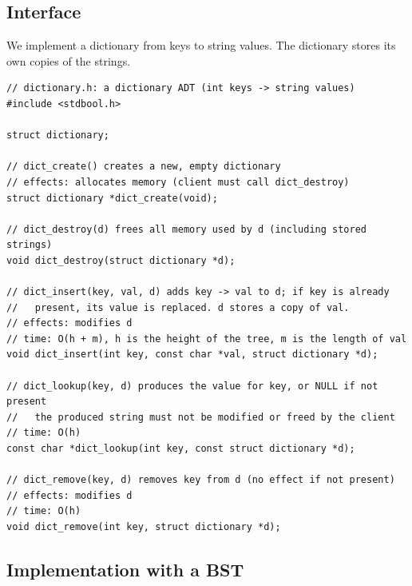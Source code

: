 \subsection{Interface}

We implement a dictionary from  keys to string values. The dictionary stores its own
copies of the strings.
\begin{lstlisting}[style=c]
// dictionary.h: a dictionary ADT (int keys -> string values)
#include <stdbool.h>

struct dictionary;

// dict_create() creates a new, empty dictionary
// effects: allocates memory (client must call dict_destroy)
struct dictionary *dict_create(void);

// dict_destroy(d) frees all memory used by d (including stored strings)
void dict_destroy(struct dictionary *d);

// dict_insert(key, val, d) adds key -> val to d; if key is already
//   present, its value is replaced. d stores a copy of val.
// effects: modifies d
// time: O(h + m), h is the height of the tree, m is the length of val
void dict_insert(int key, const char *val, struct dictionary *d);

// dict_lookup(key, d) produces the value for key, or NULL if not present
//   the produced string must not be modified or freed by the client
// time: O(h)
const char *dict_lookup(int key, const struct dictionary *d);

// dict_remove(key, d) removes key from d (no effect if not present)
// effects: modifies d
// time: O(h)
void dict_remove(int key, struct dictionary *d);
\end{lstlisting}

\subsection{Implementation with a BST}

